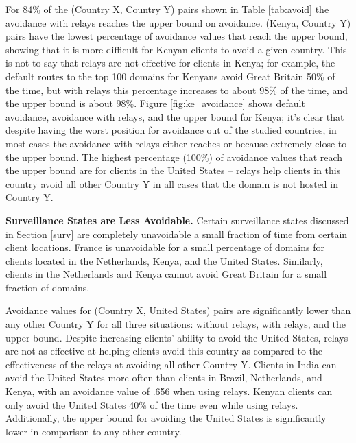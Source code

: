 
For 84\% of the (Country X, Country Y) pairs shown in Table \ref{tab:avoid} the avoidance with relays reaches the upper bound on avoidance.  (Kenya, Country Y) pairs have the lowest percentage of avoidance values that reach the upper bound, showing that it is more difficult for Kenyan clients to avoid a given country.  This is not to say that relays are not effective for clients in Kenya; for example, the default routes to the top 100 domains for Kenyans avoid Great Britain 50\% of the time, but with relays this percentage increases to about 98\% of the time, and the upper bound is about 98\%. Figure \ref{fig:ke_avoidance} shows default avoidance, avoidance with relays, and the upper bound for Kenya; it's clear that despite having the worst position for avoidance out of the studied countries, in most cases the avoidance with relays either reaches or because extremely close to the upper bound.  The highest percentage (100\%) of avoidance values that reach the upper bound are for clients in the United States -- relays help clients in this country avoid all other Country Y in all cases that the domain is not hosted in Country Y.  

{\bf Surveillance States are Less Avoidable.}
Certain surveillance states discussed in Section \ref{surv} are completely unavoidable a small fraction of time from certain client locations.  France is unavoidable for a small percentage of domains for clients located in the Netherlands, Kenya, and the United States.  Similarly, clients in the Netherlands and Kenya cannot avoid Great Britain for a small fraction of domains.  

Avoidance values for (Country X, United States) pairs are significantly lower than any other Country Y for all three situations: without relays, with relays, and the upper bound.   Despite increasing clients' ability to avoid the United States, relays are not as effective at helping clients avoid this country as compared to the effectiveness of the relays at avoiding all other Country Y.  Clients in India can avoid the United States more often than clients in Brazil, Netherlands, and Kenya, with an avoidance value of .656 when using relays.  Kenyan clients can only avoid the United States 40\% of the time even while using relays.  Additionally, the upper bound for avoiding the United States is significantly lower in comparison to any other country.  

